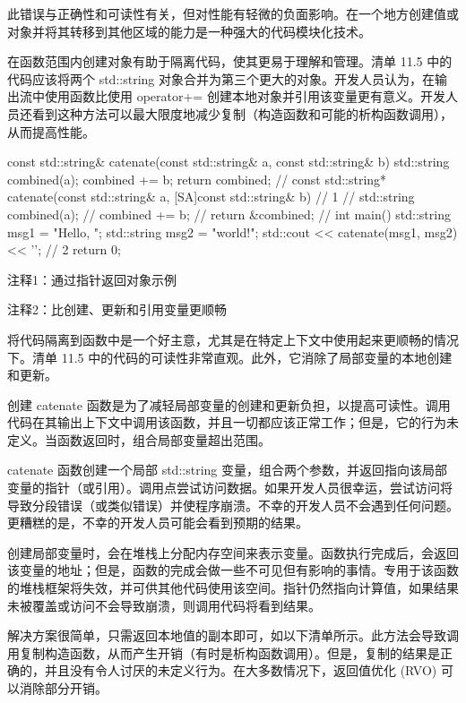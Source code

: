 此错误与正确性和可读性有关，但对性能有轻微的负面影响。在一个地方创建值或对象并将其转移到其他区域的能力是一种强大的代码模块化技术。


在函数范围内创建对象有助于隔离代码，使其更易于理解和管理。清单 11.5 中的代码应该将两个 std::string 对象合并为第三个更大的对象。开发人员认为，在输出流中使用函数比使用 operator+= 创建本地对象并引用该变量更有意义。开发人员还看到这种方法可以最大限度地减少复制（构造函数和可能的析构函数调用），从而提高性能。


\begin{cpp}
const std::string& catenate(const std::string& a, const std::string& b) {
  std::string combined(a);
  combined += b;
  return combined;
}
// const std::string* catenate(const std::string& a,
  [SA]const std::string& b) { // 1
// std::string combined(a);
// combined += b;
// return &combined;
// }
int main() {
  std::string msg1 = "Hello, ";
  std::string msg2 = "world!";
  std::cout << catenate(msg1, msg2) << '\n'; // 2
  return 0;
}
\end{cpp}

{\footnotesize
注释1：通过指针返回对象示例

注释2：比创建、更新和引用变量更顺畅
}


将代码隔离到函数中是一个好主意，尤其是在特定上下文中使用起来更顺畅的情况下。清单 11.5 中的代码的可读性非常直观。此外，它消除了局部变量的本地创建和更新。

创建 catenate 函数是为了减轻局部变量的创建和更新负担，以提高可读性。调用代码在其输出上下文中调用该函数，并且一切都应该正常工作；但是，它的行为未定义。当函数返回时，组合局部变量超出范围。

catenate 函数创建一个局部 std::string 变量，组合两个参数，并返回指向该局部变量的指针（或引用）。调用点尝试访问数据。如果开发人员很幸运，尝试访问将导致分段错误（或类似错误）并使程序崩溃。不幸的开发人员不会遇到任何问题。更糟糕的是，不幸的开发人员可能会看到预期的结果。

创建局部变量时，会在堆栈上分配内存空间来表示变量。函数执行完成后，会返回该变量的地址；但是，函数的完成会做一些不可见但有影响的事情。专用于该函数的堆栈框架将失效，并可供其他代码使用该空间。指针仍然指向计算值，如果结果未被覆盖或访问不会导致崩溃，则调用代码将看到结果。


解决方案很简单，只需返回本地值的副本即可，如以下清单所示。此方法会导致调用复制构造函数，从而产生开销（有时是析构函数调用）。但是，复制的结果是正确的，并且没有令人讨厌的未定义行为。在大多数情况下，返回值优化 (RVO) 可以消除部分开销。

